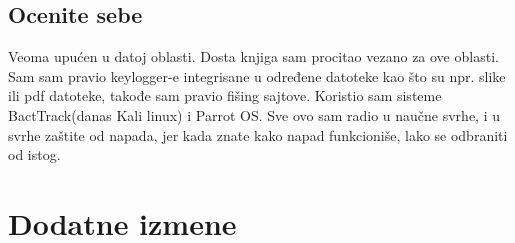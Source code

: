 \documentclass[a4paper]{report}
\newcommand{\odgovor}[1]{\textcolor{blue}{#1}}
\begin{document}
\section{Ocenite sebe}
Veoma upućen u datoj oblasti. Dosta knjiga sam procitao vezano za ove oblasti. Sam sam pravio keylogger-e integrisane u određene datoteke kao što su npr. slike ili pdf datoteke, takođe sam pravio fišing sajtove. Koristio sam sisteme BactTrack(danas Kali linux) i Parrot OS. Sve ovo sam radio u naučne svrhe, i u svrhe zaštite od napada, jer kada znate kako napad funkcioniše, lako  se odbraniti od istog.



\chapter{Dodatne izmene}
\odgovor{}
\end{document}
